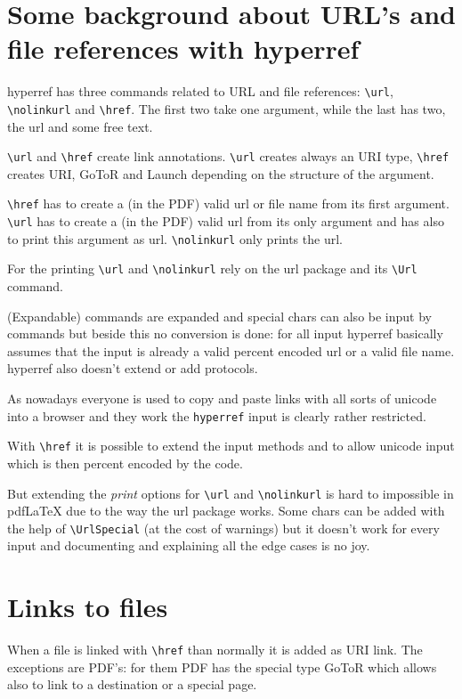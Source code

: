 \documentclass{article}
\newcommand\cs[1]{\texttt{\textbackslash #1}}
\providecommand\pkg[1]{\texttt{#1}}
\begin{document}
\section{Some background about URL's and file references with hyperref}

hyperref has three commands related to URL and file references: \cs{url},
\cs{nolinkurl} and \cs{href}. The first two take one argument,
while the last has two, the url and some free text.


\cs{url} and \cs{href} create link annotations. \cs{url} creates always an URI
type, \cs{href} creates URI, GoToR and Launch depending on the structure of the argument.

\cs{href} has to create a (in the PDF) valid url or file name from its first argument.
\cs{url} has to create a (in the PDF) valid url from its only argument and has also to print
this argument as url. \cs{nolinkurl} only prints the url.

For the printing \cs{url} and \cs{nolinkurl} rely on the url package and its \cs{Url} command.

(Expandable) commands are expanded and special chars can also be input by commands but
beside this no conversion is done: for all input hyperref basically assumes that
the input is already a valid percent encoded url or a valid file name. hyperref also
doesn't extend or add protocols.

As nowadays everyone is used to copy and paste links with all sorts of unicode into a browser and
they work the \pkg{hyperref} input is clearly rather restricted.


With \cs{href} it is possible to extend the input methods and to allow unicode input which is then
percent encoded by the code.

But extending the \emph{print} options for \cs{url} and \cs{nolinkurl}
is hard to impossible in pdf\LaTeX{} due to the way the url package works.
Some chars can be added with the help of \cs{UrlSpecial} (at the cost of warnings)
but it doesn't work for every input and documenting and explaining all the edge cases is no joy.

\section{Links to files}

When a file is linked with \cs{href} than normally it is added as URI link. The exceptions are PDF's:
for them PDF has the special type GoToR which allows also to link to a destination or a special page.
\end{document}
